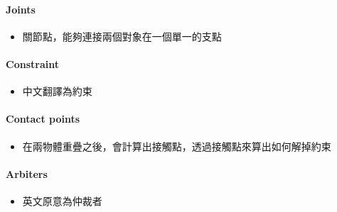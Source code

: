 \paragraph{Joints}
\begin{itemize}
    \item{關節點，能夠連接兩個對象在一個單一的支點}
\end{itemize}

\paragraph{Constraint}
\begin{itemize}
    \item{中文翻譯為約束}
\end{itemize}

\paragraph{Contact points}
\begin{itemize}
    \item{在兩物體重疊之後，會計算出接觸點，透過接觸點來算出如何解掉約束}
\end{itemize}

\paragraph{Arbiters}
\begin{itemize}
    \item{英文原意為仲裁者}
\end{itemize}

